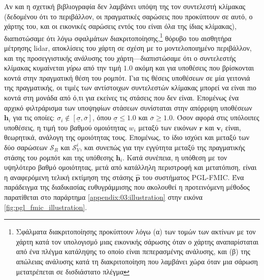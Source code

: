 Αν και η σχετική βιβλιογραφία δεν λαμβάνει υπόψη της τον συντελεστή κλίμακας
(δεδομένου ότι το περιβάλλον, οι πραγματικές σαρώσεις που προκύπτουν σε αυτό, ο
χάρτης του, και οι εικονικές σαρώσεις εντός του είναι όλα της ίδιας κλίμακας),
διαπιστώσαμε ότι λόγω σφαλμάτων διακριτοποίησης,\footnote{Σφάλματα
διακριτοποίησης προκύπτουν λόγω (α) των τομών των ακτίνων με τον χάρτη κατά τον
υπολογισμό μιας εικονικής σάρωσης όταν ο χάρτης αναπαρίσταται από ένα πλέγμα
κατάληψης το οποίο είναι πεπερασμένης ανάλυσης, και (β) της απώλειας ανάλυσης
κατά τη διακριτοποίηση που λαμβάνει χώρα όταν μια σάρωση μετατρέπεται σε
δισδιάστατο πλέγμα} θόρυβο του αισθητήρα μέτρησης lidar, αποκλίσεις του χάρτη
σε σχέση με το μοντελοποιημένο περιβάλλον, και της προσεγγιστικής ανάλυσης του
χάρτη---διαπιστώσαμε ότι ο συντελεστής κλίμακας κυμαίνεται \textit{γύρω} από
την τιμή $1.0$ ακόμη και για υποθέσεις που βρίσκονται κοντά στην πραγματική
θέση του ρομπότ. Για τις θέσεις υποθέσεων σε μία γειτονιά της πραγματικής, οι
τιμές των αντίστοιχων συντελεστών κλίμακας μπορεί να είναι πιο κοντά στη μονάδα
από ό,τι για εκείνες τις στάσεις που δεν είναι. Επομένως ένα αρχικό φιλτράρισμα
των υποψηφίων στάσεων συνίσταται στην απόρριψη υποθέσεων $\bm{h}_i$ για τις
οποίες: $\sigma_i \not\in [\underline{\sigma}, \overline{\sigma}]$, όπου
$\underline{\sigma} \leq 1.0$ και $\overline{\sigma} \geq 1.0$. Όσον αφορά στις
υπόλοιπες υποθέσεις, η τιμή του βαθμού ομοιότητας $w_i$ μεταξύ των εικόνων
$\bm{r}$ και $\bm{v}_i$ είναι, θεωρητικά, ανάλογη της ομοιότητας τους.
Επομένως, το ίδιο ισχύει και μεταξύ των δύο σαρώσεων $\mathcal{S}_R$ και
$\mathcal{S}_V^i$, και συνεπώς για την εγγύτητα μεταξύ της πραγματικής στάσης
του ρομπότ και της υπόθεσης $\bm{h}_i$.  Κατά συνέπεια, η υπόθεση με τον
υψηλότερο βαθμό ομοιότητας, μετά από κατάλληλη περιστροφή και μετατόπιση, είναι
η αναφερόμενη τελική εκτίμηση της στάσης $\bm{\hat{p}}$ του συστήματος
PGL-FMIC. Ένα παράδειγμα της διαδικασίας ευθυγράμμισης που ακολουθεί η
προτεινόμενη μέθοδος παρατίθεται στο παράρτημα \ref{appendix:03:illustration}
στην εικόνα \ref{fig:pgl_fmic_illustration}.
